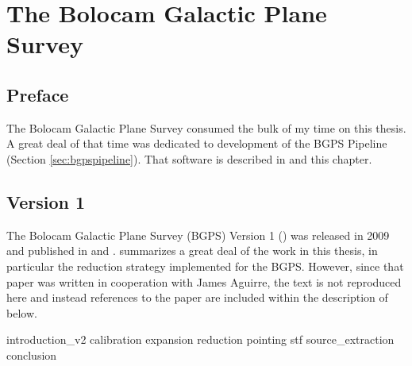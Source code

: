 
\chapter{The Bolocam Galactic Plane Survey}
\label{ch:v2}

\section{Preface}
The Bolocam Galactic Plane Survey consumed the bulk of my time on this thesis.
A great deal of that time was dedicated to development of the BGPS Pipeline
(Section \ref{sec:bgpspipeline}).  That software is described in \citet{Aguirre2011}
and this chapter.

\section{Version 1}
The Bolocam Galactic Plane Survey (BGPS) Version 1 (\vone) was released in 2009 and published in
\citet{Aguirre2011} and \citet{Rosolowsky2010}.  \citet{Aguirre2011} summarizes 
a great deal of the work in this thesis, in particular the reduction strategy
implemented for the BGPS.  However, since that paper was written in cooperation
with James Aguirre, the text is not reproduced here and instead references to
the paper are included within the description of \vtwo below.

{introduction_v2}
{calibration} %
{expansion}
{reduction} %
{pointing} %
{stf} %
{source_extraction} %
{conclusion}



